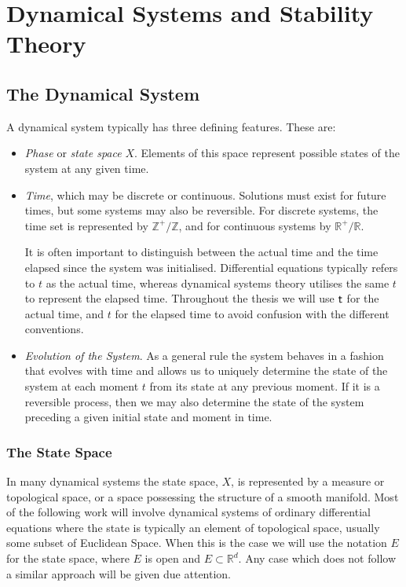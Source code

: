 
\chapter{Dynamical Systems and Stability Theory}
 \setcounter{page}{1}
\pagestyle{headings}
\section{The Dynamical System}

A dynamical system typically has three defining features. These
are:

\begin{itemize}
  \item \emph{Phase} or \emph{state space} $X$. Elements of this space
        represent possible states of the system at any given time.
  \item {\em Time}, which may be discrete or continuous. Solutions
        must exist for future times, but some systems may also be reversible.
        For discrete systems, the time set is represented by
        $\mathbb{Z}^+/\mathbb{Z}$, and for continuous systems  by
        $\mathbb{R}^+/\mathbb{R}$. 

It is often important to distinguish between the actual time and the time elapsed since the system was initialised. Differential equations typically refers to $t$ as the actual time, whereas dynamical systems theory utilises the same $t$ to represent the elapsed time. Throughout the thesis we will use $ \mathsf{\mathsf{t}}$ for the actual time, and $t$ for the elapsed time to avoid confusion with the different conventions.

  \item {\em Evolution of the System}. As a general rule the system behaves
        in a fashion that evolves with time and allows us to uniquely
        determine the state of the system at each moment $t$ from its
        state at any previous moment. If it is a reversible process, then
        we may also determine the state of the system preceding a given
        initial state and moment in time.
\end{itemize}

\subsection{The State Space}

In many dynamical systems the state space, $X$, is represented by
a measure or topological space, or a space possessing the
structure of a smooth manifold. Most of the following work will
involve dynamical systems of ordinary differential equations where
the state is typically an element of topological space, usually
some subset of Euclidean Space. When this is the case we will use
the notation $E$ for the state space, where $E$ is open and $E
\subset \mathbb{R}^d$. Any case which does not follow a similar
approach will be given due attention.

